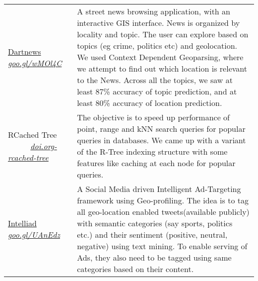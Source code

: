 \documentclass[8pt]{article}
\begin{document}
\begin{tabular}[t]{@{}>{\raggedright\arraybackslash}p{\textwidth-\rcollength-150pt}p{\rcollength+150pt}}
        \href{https://goo.gl/wMOl4C}{Dartnews} \href{https://goo.gl/wMOl4C}{\textit{goo.gl/wMOl4C}}  & \hspace{0.5cm} A street news browsing application, with an interactive GIS interface. News is organized by locality and topic. The user can explore based on topics (eg crime, politics etc) and geolocation. We used Context Dependent Geoparsing, where we attempt to find out which location is relevant to the News. Across all the topics, we saw at least 87\% accuracy of topic prediction, and at least 80\% accuracy of location prediction.\\[0.1cm]
        RCached Tree ~~~~~ \href{https://doi.org/10.1145/2505515.2507817}{\textit{doi.org-rcached-tree}} & \hspace{0.5cm}  The objective is to speed up performance of point, range and kNN search queries for popular queries in databases. We came up with a variant of the R-Tree indexing structure with some features like caching at each node for popular queries.\\[0.1cm]
        \href{http://github.com/debjyoti385/intelliad}{Intelliad} \href{https://goo.gl/UAnEdz}{\textit{goo.gl/UAnEdz}} & \hspace{0.5cm} A Social Media driven Intelligent Ad-Targeting framework using Geo-profiling. The idea is to tag all geo-location enabled tweets(available publicly) with semantic categories (say sports, politics etc.) and their sentiment (positive, neutral, negative) using text mining. To enable serving of Ads, they also need to be tagged using same categories based on their content. \\

\end{tabular}
\end{document}
